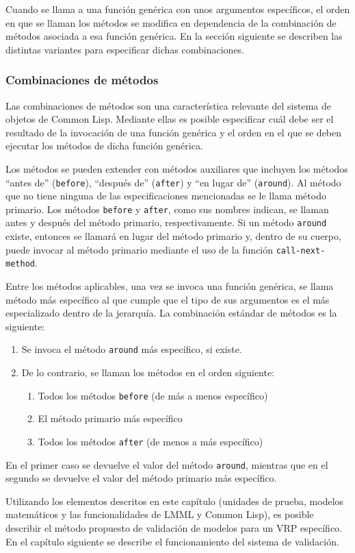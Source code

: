 Cuando se llama a una función genérica con unos argumentos específicos, el orden en que se llaman los métodos se modifica en dependencia de la combinación de métodos asociada a esa función genérica. En la sección siguiente se describen las distintas variantes para especificar dichas combinaciones.

\subsubsection{Combinaciones de métodos}\label{subsubsec:combination}

Las combinaciones de métodos son una característica relevante del sistema de objetos de Common Lisp. Mediante ellas es posible especificar cuál debe ser el resultado de la invocación de una función genérica y el orden en el que se deben ejecutar los métodos de dicha función genérica.

Los métodos se pueden extender con métodos auxiliares que incluyen los métodos ``antes de'' ({\tt before}), ``después de'' ({\tt after}) y ``en lugar de'' ({\tt around}). Al método que no tiene ninguna de las especificaciones mencionadas se le llama método primario. Los métodos {\tt before} y {\tt after}, como sus nombres indican, se llaman antes y después del método primario, respectivamente. Si un método {\tt around} existe, entonces se llamará en lugar del método primario y, dentro de su cuerpo, puede invocar al método primario mediante el uso de la función {\tt call-next-method}.

Entre los métodos aplicables, una vez se invoca una función genérica, se llama método más específico al que cumple que el tipo de sus argumentos es el más especializado dentro de la jerarquía. La combinación estándar de métodos es la siguiente:

\begin{enumerate}
	\item Se invoca el método {\tt around} más específico, si existe.
	\item De lo contrario, se llaman los métodos en el orden siguiente:
	\begin{enumerate}
		\item Todos los métodos {\tt before} (de más a menos específico)
		\item El método primario más específico
		\item Todos los métodos {\tt after} (de menos a más específico)
	\end{enumerate}
\end{enumerate}

En el primer caso se devuelve el valor del método {\tt around}, mientras que en el segundo se devuelve el valor del método primario más específico.

Utilizando los elementos descritos en este capítulo (unidades de prueba, modelos matemáticos y las funcionalidades de LMML y Common Lisp), es posible describir el método propuesto de validación de modelos para un VRP específico. En el capítulo siguiente se describe el funcionamiento del sistema de validación.
